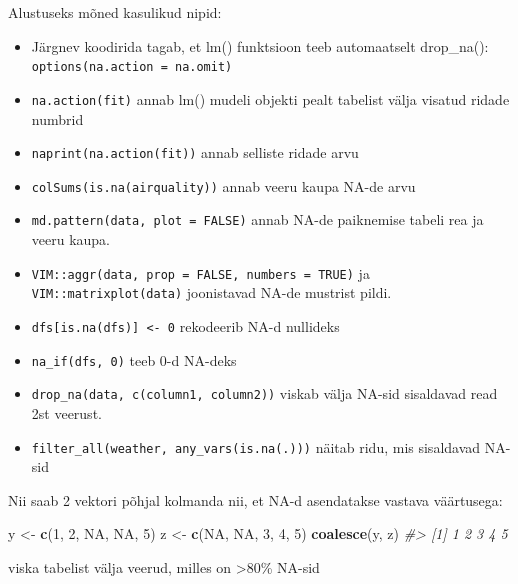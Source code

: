 \documentclass[]{book}
\newenvironment{Shaded}{\begin{snugshade}}{\end{snugshade}}
\newcommand{\KeywordTok}[1]{\textcolor[rgb]{0.13,0.29,0.53}{\textbf{#1}}}
\newcommand{\DecValTok}[1]{\textcolor[rgb]{0.00,0.00,0.81}{#1}}
\newcommand{\StringTok}[1]{\textcolor[rgb]{0.31,0.60,0.02}{#1}}
\newcommand{\CommentTok}[1]{\textcolor[rgb]{0.56,0.35,0.01}{\textit{#1}}}
\newcommand{\OtherTok}[1]{\textcolor[rgb]{0.56,0.35,0.01}{#1}}
\newcommand{\NormalTok}[1]{#1}
\begin{document}
Alustuseks mõned kasulikud nipid:

\begin{itemize}
\item
  Järgnev koodirida tagab, et lm() funktsioon teeb automaatselt
  drop\_na(): \texttt{options(na.action\ =\ na.omit)}
\item
  \texttt{na.action(fit)} annab lm() mudeli objekti pealt tabelist välja
  visatud ridade numbrid
\item
  \texttt{naprint(na.action(fit))} annab selliste ridade arvu
\item
  \texttt{colSums(is.na(airquality))} annab veeru kaupa NA-de arvu
\item
  \texttt{md.pattern(data,\ plot\ =\ FALSE)} annab NA-de paiknemise
  tabeli rea ja veeru kaupa.
\item
  \texttt{VIM::aggr(data,\ prop\ =\ FALSE,\ numbers\ =\ TRUE)} ja
  \texttt{VIM::matrixplot(data)} joonistavad NA-de mustrist pildi.
\item
  \texttt{dfs{[}is.na(dfs){]}\ \textless{}-\ 0} rekodeerib NA-d
  nullideks
\item
  \texttt{na\_if(dfs,\ 0)} teeb 0-d NA-deks
\item
  \texttt{drop\_na(data,\ c(column1,\ column2))} viskab välja NA-sid
  sisaldavad read 2st veerust.
\item
  \texttt{filter\_all(weather,\ any\_vars(is.na(.)))} näitab ridu, mis
  sisaldavad NA-sid
\end{itemize}

Nii saab 2 vektori põhjal kolmanda nii, et NA-d asendatakse vastava
väärtusega:

\begin{Shaded}
\begin{Highlighting}[]
\NormalTok{y <-}\StringTok{ }\KeywordTok{c}\NormalTok{(}\DecValTok{1}\NormalTok{, }\DecValTok{2}\NormalTok{, }\OtherTok{NA}\NormalTok{, }\OtherTok{NA}\NormalTok{, }\DecValTok{5}\NormalTok{)}
\NormalTok{z <-}\StringTok{ }\KeywordTok{c}\NormalTok{(}\OtherTok{NA}\NormalTok{, }\OtherTok{NA}\NormalTok{, }\DecValTok{3}\NormalTok{, }\DecValTok{4}\NormalTok{, }\DecValTok{5}\NormalTok{)}
\KeywordTok{coalesce}\NormalTok{(y, z)}
\CommentTok{#> [1] 1 2 3 4 5}
\end{Highlighting}
\end{Shaded}

viska tabelist välja veerud, milles on \textgreater{}80\% NA-sid
\end{document}
